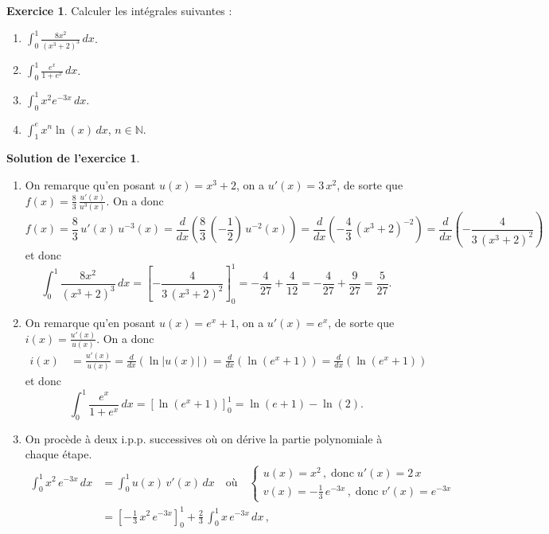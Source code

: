\documentclass[a4paper, 11pt,openany]{article}%
\theoremstyle{plain}
\theoremstyle{definition}
\newtheorem{exo}{Exercice}
\newtheorem{sol}{Solution de l'exercice}
\theoremstyle{remark}
\newcommand{\N}{\mathbb{N}}
\begin{document}
\begin{exo}
Calculer les intégrales suivantes :
\begin{multicols}{2}
\begin{enumerate}
\item $\displaystyle{\int_0^1 \frac{8x^2}{(x^3+2)^3} \, dx}$.
\item $\displaystyle{\int_0^1 \frac{e^x}{1+e^x} \, dx}$.
\item $\displaystyle{\int_0^1  x^2 e^{-3x} \, dx}$.
\item $\displaystyle{\int_1^e x^n \ln(x) \, dx}$, $n \in \N$.
\end{enumerate}
\end{multicols}
\end{exo}

\begin{sol}
\begin{enumerate}
\item  On remarque qu'en posant $u(x)=x^3+2$, on a $u'(x)= 3\,x^2$, de sorte que $f(x)=\frac{8}{3}\,\frac{u'(x)}{u^{3}(x)}$. On a donc 
\[
 f(x)=
\frac{8}{3}\,
u'(x)\,u^{-3}(x)=\frac{d}{dx} \left(\frac{8}{3}\,\left(-\frac{1}{2}\right)\,u^{-2}(x)\right)
=\frac{d}{dx} \left(-\frac{4}{3}\,(x^3+2)^{-2}\right)=\frac{d}{dx} \left(
-\frac{4}{3\,(x^3+2)^2}\right)
\] 
et donc
\[ \int_0^1 \frac{8x^2}{(x^3+2)^3} \, dx = \left[ -\frac{4}{3\,(x^3+2)^2} \right]_0^1 = -\frac{4}{27} + \frac{4}{12} = -\frac{4}{27} + \frac{9}{27} = \frac{5}{27}.\]
\item On remarque qu'en posant $u(x)=e^{x}+1$, on a $u'(x)=e^{x}$, de sorte que $i(x)=\frac{u'(x)}{u(x)}$. On a donc
\begin{align*}
 i(x)\, &=\frac{u'(x)}{u(x)}= \frac{d}{dx}\left( \ln |u(x)|\right)=\frac{d}{dx}\left(\ln(e^{x}+1)\right)=\frac{d}{dx}\left(\ln (e^{x}+1)\right)
\end{align*}
et donc
\[ \int_0^1 \frac{e^x}{1+e^x}  \, dx = \left[ \ln (e^{x}+1) \right]_0^1 = \ln(e+1) - \ln(2).\]
\item On procède à deux i.p.p. successives où on dérive la partie polynomiale à chaque étape.
\begin{align*}
\int_0^1 x^2\,e^{-3x}\, dx &= \int_0^1 u(x)\, v'(x)\, dx \quad \text{où}\quad \begin{cases}
 u(x)=x^2\,,\;\text{donc}\; u'(x)=2\,x\\
 v(x)=-\frac{1}{3}\,e^{-3x}\,,\;\text{donc}\;v'(x)=e^{-3x}\end{cases}\\
&= \left[-\frac{1}{3}\,x^2\,e^{-3x} \right]_0^1+\frac{2}{3}\,\int_0^1 x\,e^{-3x}\,dx\,,

\end{align*}
\end{enumerate}
\end{sol}
\end{document}
